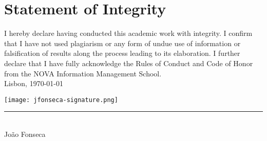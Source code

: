 \chapter*{Statement of Integrity}

I hereby declare having conducted this academic work with integrity. I confirm
that I have not used plagiarism or any form of undue use of information or
falsification of results along the process leading to its elaboration. I
further declare that I have fully acknowledge the Rules of Conduct and Code of
Honor from the NOVA Information Management School.\\

Lisbon, \usdate\today
\vspace{-.5cm}

\begin{minipage}{0.3\textwidth}
    \centering 
    \texttt{[image: jfonseca-signature.png]}\\
    \vspace{-1cm}
    \rule{\textwidth}{.3pt}\\
    \large{João Fonseca}
\end{minipage}
\vspace{0.3cm}


